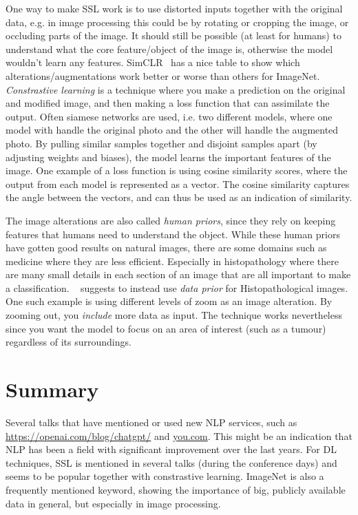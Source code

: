 \documentclass[10pt,twocolumn,letterpaper]{article}
\begin{document}
One way to make \gls{SSL} work is to use distorted inputs together with the original data, e.g. in image processing this could be by rotating or cropping the image, or occluding parts of the image. It should still be possible (at least for humans) to understand what the core feature/object of the image is, otherwise the model wouldn't learn any features.  SimCLR~\cite{simCLR} has a nice table to show which alterations/augmentations work better or worse than others for ImageNet. \textit{Constrastive learning} is a technique where you make a prediction on the original and modified image, and then making a loss function that can assimilate the output. Often siamese networks are used, i.e. two different models, where one model with handle the original photo and the other will handle the augmented photo. By pulling similar samples together and disjoint samples apart (by adjusting weights and biases), the model learns the important features of the image. One example of a loss function is using cosine similarity scores, where the output from each model is represented as a vector. The cosine similarity captures the angle between the vectors, and can thus be used as an indication of similarity. 

The image alterations are also called \textit{human priors}, since they rely on keeping features that humans need to understand the object. While these human priors have gotten good results on natural images, there are some domains such as medicine where they are less efficient. Especially in histopathology where there are many small details in each section of an image that are all important to make a classification. ~\cite{dataPriors} suggests to instead use \textit{data prior} for Histopathological images. One such example is using different levels of zoom as an image alteration. By zooming out, you \textit{include} more data as input. The technique works nevertheless since you want the model to focus on an area of interest (such as a tumour) regardless of its surroundings.

\section{Summary}\label{sec:summary}
Several talks that have mentioned or used new \gls{NLP} services, such as \href{ChatGPT}{https://openai.com/blog/chatgpt/} and \href{you.com}{you.com}. This might be an indication that \gls{NLP} has been a field with significant improvement over the last years. For \gls{DL} techniques, \gls{SSL} is mentioned in several talks (during the conference days) and seems to be popular together with constrastive learning. ImageNet is also a frequently mentioned keyword, showing the importance of big, publicly available data in general, but especially in image processing.
\end{document}
